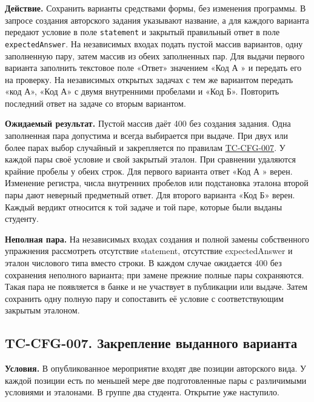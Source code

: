 \documentclass[12pt,a4paper]{article}
\begin{document}
\textbf{Действие.} Сохранить варианты средствами формы, без изменения программы. В запросе создания авторского задания указывают название, а для каждого варианта передают условие в поле \texttt{statement} и закрытый правильный ответ в поле \texttt{expected\allowbreak{}Answer}. На независимых входах подать пустой массив вариантов, одну заполненную пару, затем массив из обеих заполненных пар. Для выдачи первого варианта заполнить текстовое поле «Ответ» значением «Код А » и передать его на проверку. На независимых открытых задачах с тем же вариантом передать «код А», «Код А» с двумя внутренними пробелами и «Код Б». Повторить последний ответ на задаче со вторым вариантом.

\textbf{Ожидаемый результат.} Пустой массив даёт 400 без создания задания. Одна заполненная пара допустима и всегда выбирается при выдаче. При двух или более парах выбор случайный и закрепляется по правилам {\hyperlink{tc-cfg-007}{TC-CFG-007}}. У каждой пары своё условие и свой закрытый эталон. При сравнении удаляются крайние пробелы у обеих строк. Для первого варианта ответ «Код А » верен. Изменение регистра, числа внутренних пробелов или подстановка эталона второй пары дают неверный предметный ответ. Для второго варианта «Код Б» верен. Каждый вердикт относится к той задаче и той паре, которые были выданы студенту.

\textbf{Неполная пара.} На независимых входах создания и полной замены собственного упражнения рассмотреть отсутствие statement, отсутствие expectedAnswer и эталон числового типа вместо строки. В каждом случае ожидается 400 без сохранения неполного варианта; при замене прежние полные пары сохраняются. Такая пара не появляется в банке и не участвует в публикации или выдаче. Затем сохранить одну полную пару и сопоставить её условие с соответствующим закрытым эталоном.

\subsection{TC-CFG-007. Закрепление выданного варианта}\label{tc-cfg-007-ux437ux430ux43aux440ux435ux43fux43bux435ux43dux438ux435-ux432ux44bux434ux430ux43dux43dux43eux433ux43e-ux432ux430ux440ux438ux430ux43dux442ux430}

\hypertarget{tc-cfg-007-закрепление-выданного-варианта}{}

\hypertarget{tc-cfg-007}{}

\textbf{Условия.} В опубликованное мероприятие входят две позиции авторского вида. У каждой позиции есть по меньшей мере две подготовленные пары с различимыми условиями и эталонами. В группе два студента. Открытие уже наступило.
\end{document}
